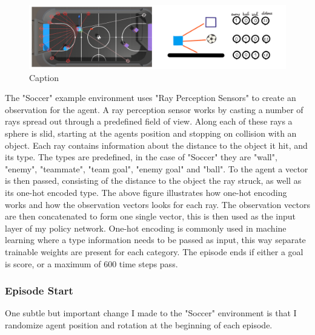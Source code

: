 \begin{figure}[H]
    \centering
    \includegraphics[width=1\linewidth]{figures/ray_sensor.png}
    \caption{Caption}
    \label{fig:ray_sensor}
\end{figure}
\noindent
The "Soccer" example environment uses "Ray Perception Sensors" to create an observation for the agent. A ray perception sensor works by casting a number of rays spread out through a predefined field of view. Along each of these rays a sphere is slid, starting at the agents position and stopping on collision with an object. Each ray contains information about the distance to the object it hit, and its type. The types are predefined, in the case of "Soccer" they are "wall", "enemy", "teammate", "team goal", "enemy goal" and "ball". To the agent a vector is then passed, consisting of the distance to the object the ray struck, as well as its one-hot encoded type. The above figure illustrates how one-hot encoding works and how the observation vectors looks for each ray. The observation vectors are then concatenated to form one single vector, this is then used as the input layer of my policy network. One-hot encoding is commonly used in machine learning where a type information needs to be passed as input, this way separate trainable weights are present for each category. The episode ends if either a goal is score, or a maximum of $600$ time steps pass.

\subsubsection{Episode Start}\label{subsubsec:ip:environment:impl:start}
One subtle but important change I made to the "Soccer" environment is that I randomize agent position and rotation at the beginning of each episode. 

